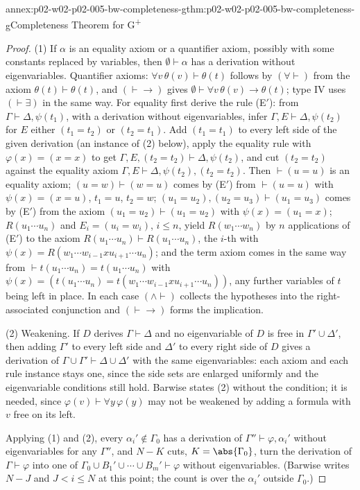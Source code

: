\begin{annexitem}{annex:p02-w02-p02-005-bw-completeness-g}{thm:p02-w02-p02-005-bw-completeness-g}{Completeness Theorem for G\textsuperscript{+}}
\begin{proof}
(1) If \(\alpha\) is an equality axiom or a quantifier axiom, possibly
with some constants replaced by variables, then \(\emptyset\vdash\alpha\)
has a derivation without eigenvariables.  Quantifier axioms:
\(\forall v\,\theta(v)\vdash\theta(t)\) follows by \((\forall\vdash)\) from
the axiom \(\theta(t)\vdash\theta(t)\), and \((\vdash\to)\) gives
\(\emptyset\vdash\forall v\,\theta(v)\to\theta(t)\); type IV uses
\((\vdash\exists)\) in the same way.  For equality first derive the rule
(E\('\)): from \(\Gamma\vdash\Delta,\psi(t_1)\), with a derivation without
eigenvariables, infer \(\Gamma,E\vdash\Delta,\psi(t_2)\) for \(E\) either
\((t_1=t_2)\) or \((t_2=t_1)\).  Add \((t_1=t_1)\) to every left side of the
given derivation (an instance of (2) below), apply the equality rule with
\(\varphi(x)=(x=x)\) to get \(\Gamma,E,(t_2=t_2)\vdash\Delta,\psi(t_2)\), and
cut \((t_2=t_2)\) against the equality axiom
\(\Gamma,E\vdash\Delta,\psi(t_2),(t_2=t_2)\).  Then \(\vdash(u=u)\) is an
equality axiom; \((u=w)\vdash(w=u)\) comes by (E\('\)) from
\(\vdash(u=u)\) with \(\psi(x)=(x=u)\), \(t_1=u\), \(t_2=w\);
\((u_1=u_2),(u_2=u_3)\vdash(u_1=u_3)\) comes by (E\('\)) from the axiom
\((u_1=u_2)\vdash(u_1=u_2)\) with \(\psi(x)=(u_1=x)\);
\(R(u_1\cdots u_n)\) and \(E_i=(u_i=w_i)\), \(i\leq n\), yield
\(R(w_1\cdots w_n)\) by \(n\) applications of (E\('\)) to the axiom
\(R(u_1\cdots u_n)\vdash R(u_1\cdots u_n)\), the \(i\)-th with
\(\psi(x)=R(w_1\cdots w_{i-1}xu_{i+1}\cdots u_n)\); and the term axiom comes
in the same way from \(\vdash t(u_1\cdots u_n)=t(u_1\cdots u_n)\) with
\(\psi(x)=(t(u_1\cdots u_n)=t(w_1\cdots w_{i-1}xu_{i+1}\cdots u_n))\), any
further variables of \(t\) being left in place.  In each case
\((\land\vdash)\) collects the hypotheses into the right-associated
conjunction and \((\vdash\to)\) forms the implication.

(2) Weakening.  If \(D\) derives \(\Gamma\vdash\Delta\) and no
eigenvariable of \(D\) is free in \(\Gamma'\cup\Delta'\), then adding
\(\Gamma'\) to every left side and \(\Delta'\) to every right side of \(D\)
gives a derivation of \(\Gamma\cup\Gamma'\vdash\Delta\cup\Delta'\) with
the same eigenvariables: each axiom and each rule instance stays one,
since the side sets are enlarged uniformly and the eigenvariable
conditions still hold.  Barwise states (2) without the condition; it is
needed, since \(\varphi(v)\vdash\forall y\,\varphi(y)\) may not be
weakened by adding a formula with \(v\) free on its left.

Applying (1) and (2), every \(\alpha_i'\notin\Gamma_0\) has a derivation of
\(\Gamma''\vdash\varphi,\alpha_i'\) without eigenvariables for any
\(\Gamma''\), and \(N-K\) cuts, \(K=\abs{\Gamma_0}\), turn the derivation of
\(\Gamma\vdash\varphi\) into one of
\(\Gamma_0\cup B_1'\cup\cdots\cup B_m'\vdash\varphi\) without
eigenvariables.  (Barwise writes \(N-J\) and \(J<i\leq N\) at this point;
the count is over the \(\alpha_i'\) outside \(\Gamma_0\).)


\end{proof}
\end{annexitem}
